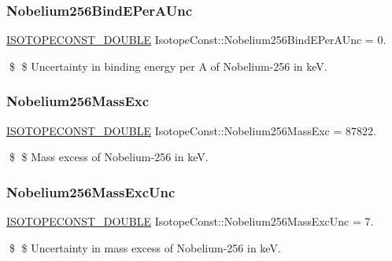 \subsubsection{\texorpdfstring{Nobelium256\+Bind\+E\+Per\+A\+Unc}{Nobelium256BindEPerAUnc}}
{\footnotesize\ttfamily \mbox{\hyperlink{group___isotope_const-_macros_ga8f45a7272ce02c0b4c65c44636ed719a}{I\+S\+O\+T\+O\+P\+E\+C\+O\+N\+S\+T\+\_\+\+D\+O\+U\+B\+LE}} Isotope\+Const\+::\+Nobelium256\+Bind\+E\+Per\+A\+Unc = 0.}

\$ \$ Uncertainty in binding energy per A of Nobelium-\/256 in keV. \mbox{\label{group___isotope_const-_nobelium-_no256_ga03603698ef281951b4cc56af8ce17316}} 
\subsubsection{\texorpdfstring{Nobelium256\+Mass\+Exc}{Nobelium256MassExc}}
{\footnotesize\ttfamily \mbox{\hyperlink{group___isotope_const-_macros_ga8f45a7272ce02c0b4c65c44636ed719a}{I\+S\+O\+T\+O\+P\+E\+C\+O\+N\+S\+T\+\_\+\+D\+O\+U\+B\+LE}} Isotope\+Const\+::\+Nobelium256\+Mass\+Exc = 87822.}

\$ \$ Mass excess of Nobelium-\/256 in keV. \mbox{\label{group___isotope_const-_nobelium-_no256_ga3c38b33012736688a781a1e29956827a}} 
\subsubsection{\texorpdfstring{Nobelium256\+Mass\+Exc\+Unc}{Nobelium256MassExcUnc}}
{\footnotesize\ttfamily \mbox{\hyperlink{group___isotope_const-_macros_ga8f45a7272ce02c0b4c65c44636ed719a}{I\+S\+O\+T\+O\+P\+E\+C\+O\+N\+S\+T\+\_\+\+D\+O\+U\+B\+LE}} Isotope\+Const\+::\+Nobelium256\+Mass\+Exc\+Unc = 7.}

\$ \$ Uncertainty in mass excess of Nobelium-\/256 in keV. \mbox{\label{group___isotope_const-_nobelium-_no256_gacc72c3ea872af93b3e410a021d13d5d5}} 
